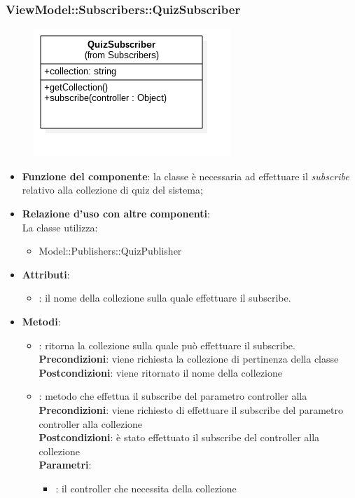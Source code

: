 \newpage

\subsubsection{ViewModel::Subscribers::QuizSubscriber}
\begin{figure}[h!]
\begin{center}
	\includegraphics[scale=0.4]{../images/ViewModel/Subscribers/QuizSubscriber.png}
\end{center}
\end{figure}
\begin{itemize}
\item\textbf{Funzione del componente}: la classe è necessaria ad effettuare il \emph{subscribe} relativo alla collezione di quiz del sistema;
	\item\textbf{Relazione d'uso con altre componenti}:\\
La classe utilizza:
	\begin{itemize}
		\item Model::Publishers::QuizPublisher
	\end{itemize}
\item\textbf{Attributi}:
	\begin{itemize}
		\item{}: il nome della collezione sulla quale effettuare il subscribe.\\	
	\end{itemize}
\item\textbf{Metodi}:
	\begin{itemize}
		\item{}: ritorna la collezione sulla quale può effettuare il subscribe.\\
		\textbf{Precondizioni}: viene richiesta la collezione di pertinenza della classe\\
		\textbf{Postcondizioni}: viene ritornato il nome della collezione\\
		\item{}: metodo che effettua il subscribe del parametro controller alla
		\textbf{Precondizioni}: viene richiesto di effettuare il subscribe del parametro controller alla collezione\\
		\textbf{Postcondizioni}: è stato effettuato il subscribe del controller alla collezione\\
		\textbf{Parametri}:
			\begin{itemize}
				\item{}: il controller che necessita della collezione\\
			\end{itemize}
	\end{itemize}
\end{itemize}

